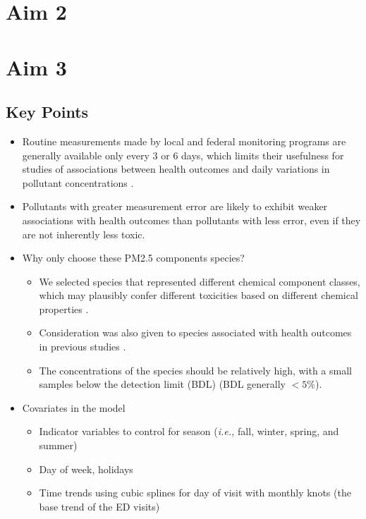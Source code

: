 \documentclass{article}
\begin{document}
\section{Aim 2}

\section{Aim 3}

\subsection{Key Points}
\begin{itemize}
    \item Routine measurements made by local and federal monitoring programs are generally available only every 3 or 6 days, which limits their usefulness for studies of associations between health outcomes and daily variations in pollutant concentrations \citep{sarnat2015fine}.
    \item Pollutants with greater measurement error are likely to exhibit weaker associations with health outcomes than pollutants with less error, even if they are not inherently less toxic.
    \item Why only choose these PM2.5 components species? {
        \begin{itemize}
            \item We selected species that represented different chemical component classes, which may plausibly confer different toxicities based on different chemical properties \citep{suh2011chemical}. 
            \item Consideration was also given to species associated with health outcomes in previous studies \citep{chen2009effects, kelly2012size, rohr2012attributing}.
            \item The concentrations of the species should be relatively high, with a small samples below the detection limit (BDL) (BDL generally $<5\%$).
        \end{itemize}
    }
    \item Covariates in the model {
        \begin{itemize}
            \item Indicator variables to control for season (\textit{i.e.,} fall, winter, spring, and summer)
            \item Day of week, holidays
            \item Time trends using cubic splines for day of visit with monthly knots (the base trend of the ED visits)

\end{itemize}}
\end{itemize}
\end{document}
